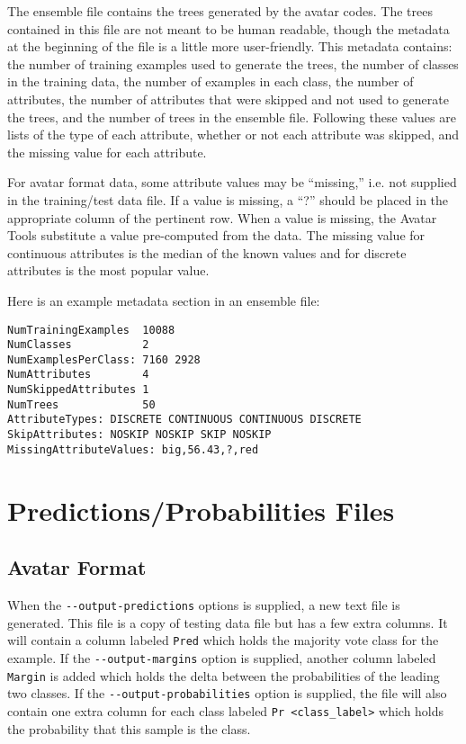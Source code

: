 \documentclass{article}
\begin{document}
The ensemble file contains the trees generated by the avatar codes. The trees contained in this
file are not meant to
be human readable, though the metadata at the beginning of the file is a little more user-friendly. This
metadata contains: the number of training examples used to generate the trees, the number of classes
in the training data, the number of examples in each class, the number of attributes, the
number of attributes that were skipped and not used to generate the trees, and the number of trees
in the ensemble file. Following these values are lists of the type of each attribute, whether or not
each attribute was skipped, and the missing value for each attribute.

For avatar format data, some attribute values may be ``missing,'' i.e. not supplied in the
training/test data file.
If a value is missing, a ``?'' should be placed in the appropriate column of the pertinent row. When
a value is missing, the Avatar Tools substitute a value pre-computed from the data. 
The missing value
for continuous attributes is the median of the known values and for discrete attributes is
the most popular value.

Here is an example metadata section in an ensemble file:

\begin{verbatim}
NumTrainingExamples  10088
NumClasses           2
NumExamplesPerClass: 7160 2928 
NumAttributes        4
NumSkippedAttributes 1
NumTrees             50
AttributeTypes: DISCRETE CONTINUOUS CONTINUOUS DISCRETE
SkipAttributes: NOSKIP NOSKIP SKIP NOSKIP
MissingAttributeValues: big,56.43,?,red
\end{verbatim}

\section{Predictions/Probabilities Files}

\subsection{Avatar Format}

When the \verb=--output-predictions= options is supplied,
a new text file is generated. This file is a copy of testing data file but has a few extra columns.
It will contain a column labeled \verb=Pred= which holds the majority vote class for the example.
If the \verb=--output-margins= option is supplied, another column labeled \verb=Margin= is
added which holds the delta between the probabilities of the leading two classes.
If the \verb=--output-probabilities= option is supplied, the file will also contain one extra
column for each class labeled \verb=Pr <class_label>= which holds the probability that this sample is
the class.
\end{document}
